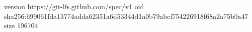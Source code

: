 version https://git-lfs.github.com/spec/v1
oid sha256:699061fda13774adda62351a6d53344d1a0b79abcf754226918f68a2a75b0a47
size 196704
